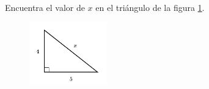 \question[15]  Encuentra el valor de $x$ en el triángulo de la figura \ref{fig:lados_pitagoras_06}.
\begin{figure}[H]
    \begin{center}
        \includegraphics[width=0.3\textwidth]{../images/lados_pitagoras_06.png}
    \end{center}
    \caption{}
    \label{fig:lados_pitagoras_06}
\end{figure}